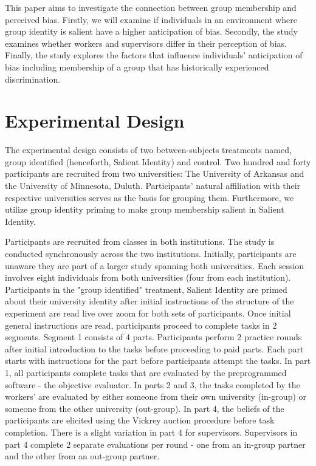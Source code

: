 This paper aims to investigate the connection between group membership and perceived bias. Firstly, we will examine if individuals in an environment where group identity is salient have a higher anticipation of bias. Secondly, the study examines whether workers and supervisors differ in their perception of bias. Finally, the study explores the factors that influence individuals' anticipation of bias including membership of a group that has historically experienced discrimination.


\section{Experimental Design} \label{sec:Design}

The experimental design consists of two between-subjects treatments named, group identified (henceforth, Salient Identity) and control. Two hundred and forty participants are recruited from two universities: The University of Arkansas and the University of Minnesota, Duluth. Participants' natural affiliation with their respective universities serves as the basis for grouping them. Furthermore, we utilize group identity priming to make group membership salient in Salient Identity. 

Participants are recruited from classes in both institutions. The study is conducted synchronously across the two institutions. Initially, participants are unaware they are part of a larger study spanning both universities. Each session involves eight individuals from both universities (four from each institution). Participants in the "group identified" treatment, Salient Identity are primed about their university identity after initial instructions of the structure of the experiment are read live over zoom for both sets of participants. Once initial general instructions are read, participants proceed to complete tasks in 2 segments. Segment 1 consists of 4 parts. Participants perform 2 practice rounds after initial introduction to the tasks before proceeding to paid parts. Each part starts with instructions for the part before participants attempt the tasks. In part 1, all participants complete tasks that are evaluated by the preprogrammed software - the objective evaluator. In parts 2 and 3, the tasks completed by the workers' are evaluated by either someone from their own university (in-group) or someone from the other university (out-group). In part 4, the beliefs of the participants are elicited using the Vickrey auction procedure \citep{karni2009} before task completion. There is a slight variation in part 4 for supervisors. Supervisors in part 4 complete 2 separate evaluations per round - one from an in-group partner and the other from an out-group partner.

